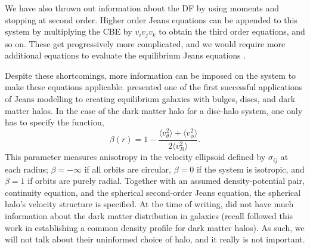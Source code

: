 We have also thrown out information about the DF by using moments and stopping at second order. Higher order Jeans equations can be appended to this system by multiplying the CBE by $v_i v_j v_k$ to obtain the third order equations, and so on. These get progressively more complicated, and we would require more additional equations to evaluate the equilibrium Jeans equations \citep{BT}.

Despite these shortcomings, more information can be imposed on the system to make these equations applicable. \citet{hernquist_1993} presented one of the first successful applications of Jeans modelling to creating equilibrium galaxies with bulges, discs, and dark matter halos. In the case of the dark matter halo for a disc-halo system, one only has to specify the function,
\begin{equation}
\beta(r) = 1 - \frac{\langle v_\theta^2\rangle + \langle v_\phi^2 \rangle}{2 \langle v_R^2 \rangle}.
\end{equation}
This parameter measures anisotropy in the velocity ellipsoid defined by $\sigma_{ij}$ at each radius; $\beta = -\infty$ if all orbits are circular, $\beta=0$ if the system is isotropic, and $\beta = 1$ if orbits are purely radial. Together with an assumed density-potential pair, continuity equation, and the spherical second-order Jeans equation, the spherical halo's velocity structure is specified. At the time of writing, \citet{hernquist_1993} did not have much information about the dark matter distribution in galaxies (recall \citep{nfw} followed this work in establishing a common density profile for dark matter halos). As such, we will not talk about their uninformed choice of halo, and it really is not important.

